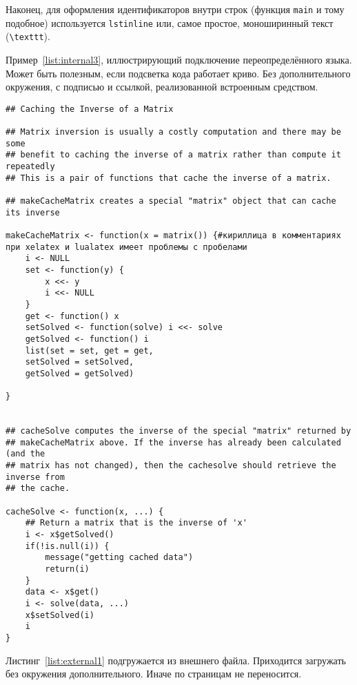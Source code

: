 Наконец, для оформления идентификаторов внутри строк
(функция \lstinline{main} и тому подобное) используется
\texttt{lstinline} или, самое простое, моноширинный текст
(\texttt{\textbackslash texttt}).


Пример~\ref{list:internal3}, иллюстрирующий подключение переопределённого языка. Может быть полезным, если подсветка кода работает криво. Без дополнительного окружения, с подписью и ссылкой, реализованной встроенным средством.
\begin{lstlisting}[language={Renhanced},caption={Пример листинга c подписью собственными средствами},label={list:internal3}]
## Caching the Inverse of a Matrix

## Matrix inversion is usually a costly computation and there may be some
## benefit to caching the inverse of a matrix rather than compute it repeatedly
## This is a pair of functions that cache the inverse of a matrix.

## makeCacheMatrix creates a special "matrix" object that can cache its inverse

makeCacheMatrix <- function(x = matrix()) {#кириллица в комментариях при xelatex и lualatex имеет проблемы с пробелами
    i <- NULL
    set <- function(y) {
        x <<- y
        i <<- NULL
    }
    get <- function() x
    setSolved <- function(solve) i <<- solve
    getSolved <- function() i
    list(set = set, get = get,
    setSolved = setSolved,
    getSolved = getSolved)
    
}


## cacheSolve computes the inverse of the special "matrix" returned by
## makeCacheMatrix above. If the inverse has already been calculated (and the
## matrix has not changed), then the cachesolve should retrieve the inverse from
## the cache.

cacheSolve <- function(x, ...) {
    ## Return a matrix that is the inverse of 'x'
    i <- x$getSolved()
    if(!is.null(i)) {
        message("getting cached data")
        return(i)
    }
    data <- x$get()
    i <- solve(data, ...)
    x$setSolved(i)
    i  
}
\end{lstlisting} %

Листинг~\ref{list:external1} подгружается из внешнего файла. Приходится загружать без окружения дополнительного. Иначе по страницам не переносится.
    






